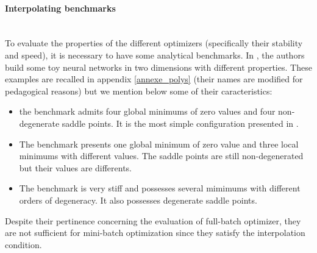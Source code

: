 \paragraph{Interpolating benchmarks}
~~\\
To evaluate the properties of the different optimizers (specifically their stability and speed), it is necessary to have some analytical benchmarks. In \cite{Bilel}, the authors build some toy neural networks in two dimensions with different properties. These examples are recalled in appendix \ref{annexe_polys} (their names are modified for pedagogical reasons) but we mention below some of their caracteristics:
\begin{itemize}
	\item the benchmark \polyTwo admits four global minimums of zero values and four non-degenerate saddle points. It is the most simple configuration presented in \cite{Bilel}.
	\item The benchmark \polyThree presents one global minimum of zero value and three local minimums with different values. The saddle points are still non-degenerated but their values are differents.
	\item The benchmark \polyFive is very stiff and possesses several mimimums with different orders of degeneracy. It also possesses degenerate saddle points. 
\end{itemize}
Despite their pertinence concerning the evaluation of full-batch optimizer, they are not sufficient for mini-batch optimization since they satisfy the interpolation condition. 

